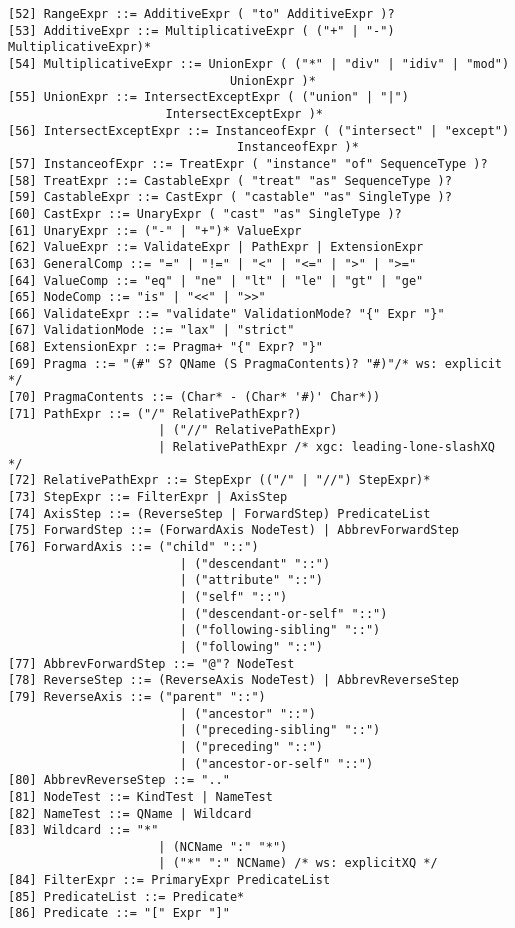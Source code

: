\begin{Verbatim}[frame=none, fontsize=\footnotesize]
[52] RangeExpr ::= AdditiveExpr ( "to" AdditiveExpr )?
[53] AdditiveExpr ::= MultiplicativeExpr ( ("+" | "-") MultiplicativeExpr)*
[54] MultiplicativeExpr ::= UnionExpr ( ("*" | "div" | "idiv" | "mod")
                               UnionExpr )*
[55] UnionExpr ::= IntersectExceptExpr ( ("union" | "|")
                      IntersectExceptExpr )*
[56] IntersectExceptExpr ::= InstanceofExpr ( ("intersect" | "except")
                                InstanceofExpr )*
[57] InstanceofExpr ::= TreatExpr ( "instance" "of" SequenceType )?
[58] TreatExpr ::= CastableExpr ( "treat" "as" SequenceType )?
[59] CastableExpr ::= CastExpr ( "castable" "as" SingleType )?
[60] CastExpr ::= UnaryExpr ( "cast" "as" SingleType )?
[61] UnaryExpr ::= ("-" | "+")* ValueExpr
[62] ValueExpr ::= ValidateExpr | PathExpr | ExtensionExpr
[63] GeneralComp ::= "=" | "!=" | "<" | "<=" | ">" | ">="
[64] ValueComp ::= "eq" | "ne" | "lt" | "le" | "gt" | "ge"
[65] NodeComp ::= "is" | "<<" | ">>"
[66] ValidateExpr ::= "validate" ValidationMode? "{" Expr "}"
[67] ValidationMode ::= "lax" | "strict"
[68] ExtensionExpr ::= Pragma+ "{" Expr? "}"
[69] Pragma ::= "(#" S? QName (S PragmaContents)? "#)"/* ws: explicit */
[70] PragmaContents ::= (Char* - (Char* '#)' Char*))
[71] PathExpr ::= ("/" RelativePathExpr?)
                     | ("//" RelativePathExpr)
                     | RelativePathExpr /* xgc: leading-lone-slashXQ */
[72] RelativePathExpr ::= StepExpr (("/" | "//") StepExpr)*
[73] StepExpr ::= FilterExpr | AxisStep
[74] AxisStep ::= (ReverseStep | ForwardStep) PredicateList
[75] ForwardStep ::= (ForwardAxis NodeTest) | AbbrevForwardStep
[76] ForwardAxis ::= ("child" "::")
                        | ("descendant" "::")
                        | ("attribute" "::")
                        | ("self" "::")  
                        | ("descendant-or-self" "::")
                        | ("following-sibling" "::")
                        | ("following" "::")
[77] AbbrevForwardStep ::= "@"? NodeTest
[78] ReverseStep ::= (ReverseAxis NodeTest) | AbbrevReverseStep
[79] ReverseAxis ::= ("parent" "::")
                        | ("ancestor" "::")
                        | ("preceding-sibling" "::")
                        | ("preceding" "::")
                        | ("ancestor-or-self" "::")
[80] AbbrevReverseStep ::= ".."
[81] NodeTest ::= KindTest | NameTest
[82] NameTest ::= QName | Wildcard
[83] Wildcard ::= "*"
                     | (NCName ":" "*")
                     | ("*" ":" NCName) /* ws: explicitXQ */
[84] FilterExpr ::= PrimaryExpr PredicateList
[85] PredicateList ::= Predicate*
[86] Predicate ::= "[" Expr "]"

\end{Verbatim}
